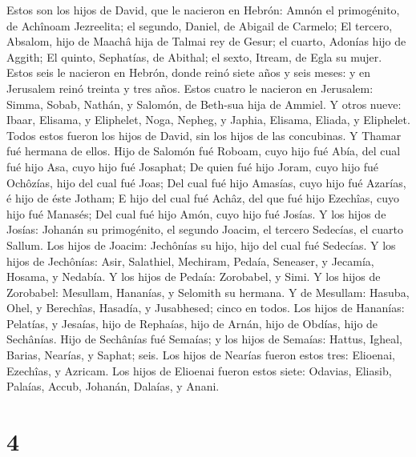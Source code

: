  Estos son los hijos de David, que le nacieron en Hebrón:
Amnón el primogénito, de Achînoam Jezreelita; el segundo, Daniel, de
Abigail de Carmelo;  El tercero, Absalom, hijo de Maachâ
hija de Talmai rey de Gesur; el cuarto, Adonías hijo de Aggith;
 El quinto, Sephatías, de Abithal; el sexto, Itream, de Egla
su mujer.  Estos seis le nacieron en Hebrón, donde reinó
siete años y seis meses: y en Jerusalem reinó treinta y tres años.
 Estos cuatro le nacieron en Jerusalem: Simma, Sobab,
Nathán, y Salomón, de Beth-sua hija de Ammiel.  Y otros
nueve: Ibaar, Elisama, y Eliphelet,  Noga, Nepheg, y Japhia,
 Elisama, Eliada, y Eliphelet.  Todos estos
fueron los hijos de David, sin los hijos de las concubinas. Y Thamar fué
hermana de ellos.  Hijo de Salomón fué Roboam, cuyo hijo
fué Abía, del cual fué hijo Asa, cuyo hijo fué Josaphat; 
De quien fué hijo Joram, cuyo hijo fué Ochôzías, hijo del cual fué Joas;
 Del cual fué hijo Amasías, cuyo hijo fué Azarías, é hijo
de éste Jotham;  E hijo del cual fué Achâz, del que fué
hijo Ezechîas, cuyo hijo fué Manasés;  Del cual fué hijo
Amón, cuyo hijo fué Josías.  Y los hijos de Josías: Johanán
su primogénito, el segundo Joacim, el tercero Sedecías, el cuarto
Sallum.  Los hijos de Joacim: Jechônías su hijo, hijo del
cual fué Sedecías.  Y los hijos de Jechônías: Asir,
Salathiel,  Mechiram, Pedaía, Seneaser, y Jecamía, Hosama,
y Nedabía.  Y los hijos de Pedaía: Zorobabel, y Simi. Y los
hijos de Zorobabel: Mesullam, Hananías, y Selomith su hermana.
 Y de Mesullam: Hasuba, Ohel, y Berechîas, Hasadía, y
Jusabhesed; cinco en todos.  Los hijos de Hananías:
Pelatías, y Jesaías, hijo de Rephaías, hijo de Arnán, hijo de Obdías,
hijo de Sechânías.  Hijo de Sechânías fué Semaías; y los
hijos de Semaías: Hattus, Igheal, Barias, Nearías, y Saphat; seis.
 Los hijos de Nearías fueron estos tres: Elioenai,
Ezechîas, y Azricam.  Los hijos de Elioenai fueron estos
siete: Odavias, Eliasib, Palaías, Accub, Johanán, Dalaías, y Anani.

\hypertarget{section-3}{%
\section{4}\label{section-3}}

